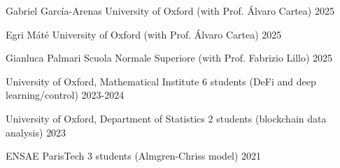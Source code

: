 \vspace{0mm}
\vspace{-1mm}
\begin{cvhonors}

    
   \cvhonor
    {Gabriel Garc\'{i}a-Arenas} %
    {University of Oxford (with Prof. \'Alvaro Cartea)} %
    {} %
    {2025} %

    \cvhonor
    {Egri Máté} %
    {University of Oxford (with Prof. \'Alvaro Cartea)} %
    {} %
    {2025} %
    
    \cvhonor
    {Gianluca Palmari} %
    {Scuola Normale Superiore (with Prof. Fabrizio Lillo)} %
    {} %
    {2025} %

    
\end{cvhonors}


\vspace{0mm}
\vspace{-1mm}
\begin{cvhonors}

    
   \cvhonor
    {University of Oxford, Mathematical Institute} %
    {6 students (DeFi and 
    deep learning/control)} %
    {} %
    {2023-2024} %


    \cvhonor
    {University of Oxford, Department of Statistics} %
    {2 students (blockchain data analysis)} %
    {} %
    {2023} %




    \cvhonor
    {ENSAE ParisTech} %
    {3 students (Almgren-Chriss model)} %
    {} %
    {2021} %



\end{cvhonors}
